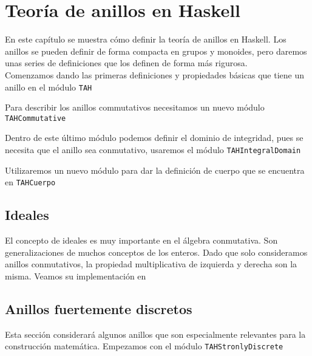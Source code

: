\chapter{Teoría de anillos en Haskell}\label{sec:anillosHas}

En este capítulo se muestra cómo definir la teoría de anillos en Haskell. Los anillos se pueden definir de forma compacta en grupos y monoides, pero daremos unas series de definiciones que los definen de forma más rigurosa.\\

Comenzamos dando las primeras definiciones y propiedades básicas que tiene un anillo en el módulo \texttt{TAH} 

Para describir los anillos commutativos necesitamos un nuevo módulo \texttt{TAHCommutative}

Dentro de este último módulo podemos definir el dominio de integridad, pues se necesita que el anillo sea conmutativo, usaremos el módulo \texttt{TAHIntegralDomain}

Utilizaremos un nuevo módulo para dar la definición de cuerpo que se encuentra en \texttt{TAHCuerpo}

\section{Ideales}
El concepto de ideales es muy importante en el álgebra conmutativa. Son
generalizaciones de muchos conceptos de los enteros. Dado que solo consideramos anillos conmutativos, la propiedad multiplicativa de izquierda y derecha son la misma. Veamos su implementación en 

\section{Anillos fuertemente discretos}
Esta sección considerará algunos anillos que son especialmente relevantes para la construcción matemática. Empezamos con el módulo \texttt{TAHStronlyDiscrete}


